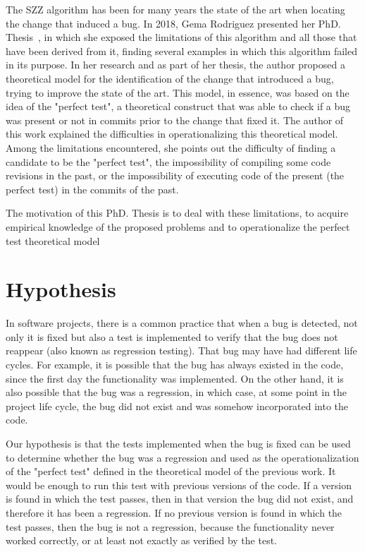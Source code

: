 The SZZ algorithm has been for many years the state of the art when locating the change that induced a bug. 
In 2018, Gema Rodriguez presented her PhD. Thesis~\cite{rodriguez2018towards}, in which she exposed the limitations of this algorithm and all those that have been derived from it, finding several examples in which this algorithm failed in its purpose. 
In her research and as part of her thesis, the author proposed a theoretical model for the identification of the change that introduced a bug, trying to improve the state of the art. 
This model, in essence, was based on the idea of the "perfect test", a theoretical construct that was able to check if a bug was present or not in commits prior to the change that fixed it. The author of this work explained the difficulties in operationalizing this theoretical model. 
Among the limitations encountered, she points out the difficulty of finding a candidate to be the "perfect test", the impossibility of compiling some code revisions in the past, or the impossibility of executing code of the present (the perfect test) in the commits of the past.

The motivation of this PhD. Thesis is to deal with these limitations, to acquire empirical knowledge of the proposed problems and to operationalize the perfect test theoretical model

\section{Hypothesis}

In software projects, there is a common practice that when a bug is detected, not only it is fixed but also a test is implemented to verify that the bug does not reappear (also known as regression testing). 
That bug may have had different life cycles. 
For example, it is possible that the bug has always existed in the code, since the first day the functionality was implemented. 
On the other hand, it is also possible that the bug was a regression, in which case, at some point in the project life cycle, the bug did not exist and was somehow incorporated into the code. 

Our hypothesis is that the tests implemented when the bug is fixed can be used to determine whether the bug was a regression and used as the operationalization of the "perfect test" defined in the theoretical model of the previous work. 
It would be enough to run this test with previous versions of the code. 
If a version is found in which the test passes, then in that version the bug did not exist, and therefore it has been a regression. 
If no previous version is found in which the test passes, then the bug is not a regression, because the functionality never worked correctly, or at least not exactly as verified by the test.

